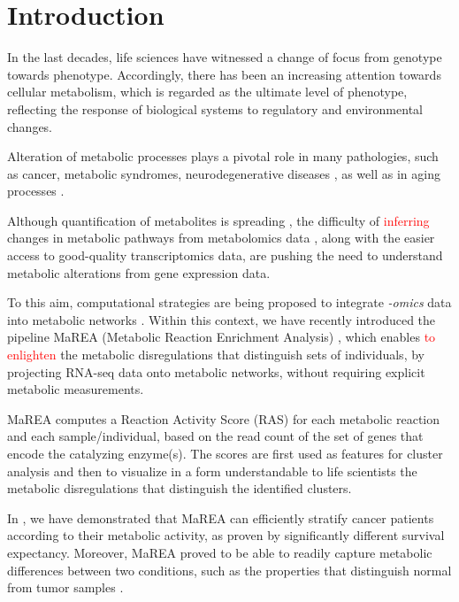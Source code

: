 \documentclass[preprint,12pt,authoryear]{elsarticle}
\begin{document}

 \section{Introduction}
In the last decades, life sciences have witnessed a change of focus from genotype towards phenotype. Accordingly, there has been an increasing attention towards cellular metabolism, which is regarded as the ultimate level of phenotype, reflecting the response of biological systems to regulatory and environmental changes. 

Alteration of metabolic processes plays a pivotal role in many pathologies, such as cancer, metabolic syndromes, neurodegenerative diseases \citep{hotamisligil2006inflammation,ward2012metabolic}, as well as in aging processes \citep{lopez2016metabolic}.  

Although quantification of metabolites is spreading \citep{Holmes2008}, the difficulty of \textcolor{red}{inferring} changes in metabolic pathways from metabolomics data \citep{damiani2016linking}, along with the easier access to good-quality transcriptomics data, are pushing the need to understand metabolic alterations from gene expression data.

To this aim, computational strategies are being proposed to integrate \textit{-omics} data into metabolic networks \citep{machado2014systematic,yizhak2015modeling,opdam2017systematic}. Within this context, we have recently introduced the pipeline \textsf{MaREA} (Metabolic Reaction Enrichment Analysis) \citep{marea},
which enables \textcolor{red}{to enlighten} the metabolic disregulations that distinguish sets of individuals, by projecting RNA-seq data onto metabolic networks, without requiring explicit metabolic measurements. 

\textsf{MaREA} computes a Reaction Activity Score (RAS) for each metabolic reaction and each sample/individual, based on the read count of the set of genes that encode the catalyzing enzyme(s). 
The scores are first used as features for cluster analysis and then to visualize in a form understandable to life scientists the metabolic disregulations that distinguish the identified clusters.

In \citep{marea}, we have demonstrated that \textsf{MaREA} can efficiently stratify cancer patients according to their metabolic activity, as proven by significantly different survival expectancy.
Moreover, \textsf{MaREA} proved to be able to readily capture metabolic differences between two conditions, such as the properties that distinguish normal from tumor samples \citep{marea}.
\end{document}
